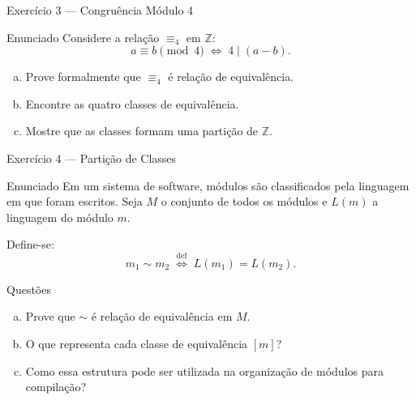 \documentclass[9pt]{beamer}
\begin{document}
\begin{frame}{Exercício 3 — Congruência Módulo 4}

\begin{block}{Enunciado}
Considere a relação $\equiv_4$ em $\mathbb{Z}$:
\[
a \equiv b \pmod{4} \;\Longleftrightarrow\; 4 \mid (a-b).
\]
\begin{enumerate}[(a)]
  \item Prove formalmente que $\equiv_4$ é relação de equivalência.
  \item Encontre as quatro classes de equivalência.
  \item Mostre que as classes formam uma partição de $\mathbb{Z}$.
\end{enumerate}
\end{block}

\end{frame}

\begin{frame}{Exercício 4 — Partição de Classes}

\begin{block}{Enunciado}
Em um sistema de software, módulos são classificados pela linguagem em que foram escritos. Seja $M$ o conjunto de todos os módulos e $L(m)$ a linguagem do módulo $m$.

Define-se:
\[
m_1 \sim m_2 \;\stackrel{\text{def}}{\Longleftrightarrow}\; L(m_1) = L(m_2).
\]
\end{block}

\begin{block}{Questões}
\begin{enumerate}[(a)]
  \item Prove que $\sim$ é relação de equivalência em $M$.
  \item O que representa cada classe de equivalência $[m]$?
  \item Como essa estrutura pode ser utilizada na organização de módulos para compilação?
\end{enumerate}
\end{block}

\end{frame}
\end{document}
